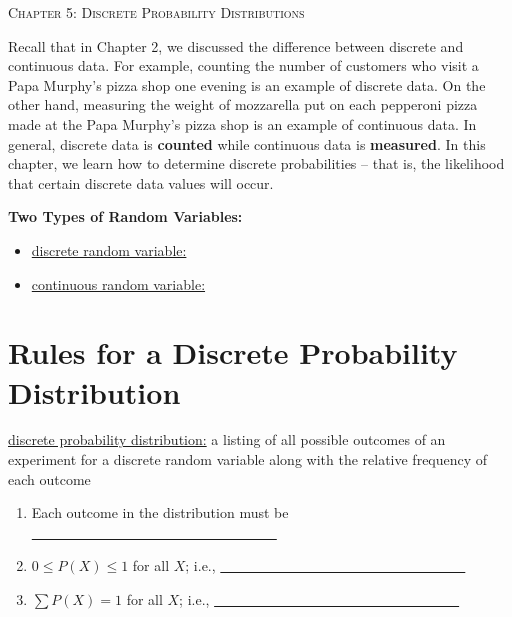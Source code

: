 \documentclass[12pt, letterpaper]{article}
\theoremstyle{definition}
\begin{document}


\begin{center}

{\LARGE \textsc{Chapter 5:  Discrete Probability Distributions}}
\end{center}


\begin{statement}
Recall that in Chapter 2, we discussed the difference between discrete and continuous data.  For example, counting the number of customers who visit a Papa Murphy's pizza shop one evening is an example of discrete data.  On the other hand, measuring the weight of mozzarella put on each pepperoni pizza made at the Papa Murphy's pizza shop is an example of continuous data.  In general, discrete data is \textbf{counted} while continuous data is \textbf{measured}.  In this chapter, we learn how to determine discrete probabilities -- that is, the likelihood that certain discrete data values will occur.
\end{statement}


\begin{defn}
\textbf{Two Types of Random Variables:}
\begin{itemize}
\item \underline{discrete random variable:}
\vspace*{.8in}
\item \underline{continuous random variable:}
\vspace*{.8in}
\end{itemize}
\end{defn}


\section*{Rules for a Discrete Probability Distribution}

\begin{statement}
\underline{discrete probability distribution:}  a listing of all possible outcomes of an experiment for a discrete random variable along with the relative frequency of each outcome

\begin{enumerate}

\item Each outcome in the distribution must be \underline{~~~~~~~~~~~~~~~~~~~~~~~~~~~~~~~~~~~}
\vspace*{.3in}

\item $0\leq P(X)\leq 1$ for all $X$; i.e., \underline{~~~~~~~~~~~~~~~~~~~~~~~~~~~~~~~~~~~}
\vspace*{.3in}

\item $\sum P(X) =1 $ for all $X$; i.e., \underline{~~~~~~~~~~~~~~~~~~~~~~~~~~~~~~~~~~~}
\vspace*{.3in}

\end{enumerate}

\end{statement}
\end{document}
